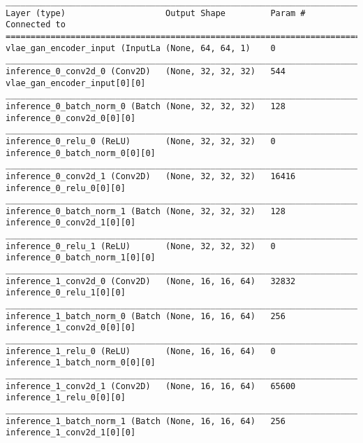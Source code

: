 \begin{lstlisting}[caption={\textsc{Mnist}-\ac{VLAE}-\ac{GAN} Encoder},captionpos=b,basicstyle=\tiny, label={lst:mnist-vlae-gan-encoder}]
__________________________________________________________________________________________________
Layer (type)                    Output Shape         Param #     Connected to
==================================================================================================
vlae_gan_encoder_input (InputLa (None, 64, 64, 1)    0
__________________________________________________________________________________________________
inference_0_conv2d_0 (Conv2D)   (None, 32, 32, 32)   544         vlae_gan_encoder_input[0][0]
__________________________________________________________________________________________________
inference_0_batch_norm_0 (Batch (None, 32, 32, 32)   128         inference_0_conv2d_0[0][0]
__________________________________________________________________________________________________
inference_0_relu_0 (ReLU)       (None, 32, 32, 32)   0           inference_0_batch_norm_0[0][0]
__________________________________________________________________________________________________
inference_0_conv2d_1 (Conv2D)   (None, 32, 32, 32)   16416       inference_0_relu_0[0][0]
__________________________________________________________________________________________________
inference_0_batch_norm_1 (Batch (None, 32, 32, 32)   128         inference_0_conv2d_1[0][0]
__________________________________________________________________________________________________
inference_0_relu_1 (ReLU)       (None, 32, 32, 32)   0           inference_0_batch_norm_1[0][0]
__________________________________________________________________________________________________
inference_1_conv2d_0 (Conv2D)   (None, 16, 16, 64)   32832       inference_0_relu_1[0][0]
__________________________________________________________________________________________________
inference_1_batch_norm_0 (Batch (None, 16, 16, 64)   256         inference_1_conv2d_0[0][0]
__________________________________________________________________________________________________
inference_1_relu_0 (ReLU)       (None, 16, 16, 64)   0           inference_1_batch_norm_0[0][0]
__________________________________________________________________________________________________
inference_1_conv2d_1 (Conv2D)   (None, 16, 16, 64)   65600       inference_1_relu_0[0][0]
__________________________________________________________________________________________________
inference_1_batch_norm_1 (Batch (None, 16, 16, 64)   256         inference_1_conv2d_1[0][0]

\end{lstlisting}
